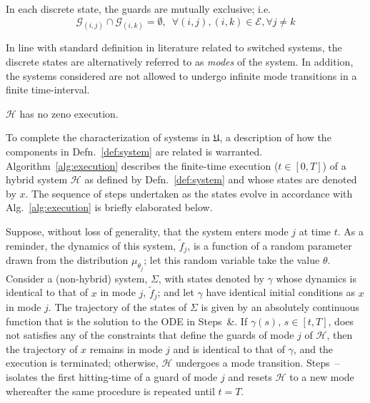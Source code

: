 \begin{assump}
    In each discrete state, the guards are mutually exclusive; i.e.
    $$\mathcal G_{(i,j)}\cap \mathcal G_{(i,k)}=\emptyset,\phantom{8}\forall (i,j),(i,k)\in \mathcal E, \forall j\ne k$$
\end{assump}
In line with standard definition in literature related to switched systems, the discrete states are alternatively referred to as {\em modes} of the system. In addition, the systems considered are not allowed to undergo infinite mode transitions in a finite time-interval.
\begin{assump}
  $\mathcal H$ has no zeno execution.
\end{assump}
To complete the characterization of systems in $\mathfrak{U}$, a description of how the components in Defn.~\ref{def:system} are related is warranted. Algorithm~\ref{alg:execution} describes the finite-time execution ($t\in [0,T]$) of a hybrid system $\mathcal H$ as defined by Defn.~\ref{def:system} and whose states are denoted by $x$. The sequence of steps undertaken as the states evolve in accordance with Alg.~\ref{alg:execution} is briefly elaborated below.
\par
Suppose, without loss of generality, that the system enters mode $j$ at time $t$. As a reminder, the dynamics of this system, $\tilde f_j$, is a function of a random parameter drawn from the distribution $\mu_{\theta_j}$; let this random variable take the value $\theta$. Consider a (non-hybrid) system, $\Sigma$, with states denoted by $\gamma$ whose dynamics is identical to that of $x$ in mode $j$, $\tilde f_j$; and let $\gamma$ have identical initial conditions as $x$ in mode $j$. The trajectory of the states of $\Sigma$ is given by an absolutely continuous function that is the solution to the ODE in Steps~\&. If $\gamma(s),\,s\in [t,T]$, does not satisfies any of the constraints that define the guards of mode $j$ of $\mathcal H$, then the trajectory of $x$ remains in mode $j$ and is identical to that of $\gamma$, and the execution is terminated; otherwise, $\mathcal H$ undergoes a mode transition. Steps~-- isolates the first hitting-time of a guard of mode $j$ and resets $\mathcal H$ to a new mode whereafter the same procedure is repeated until $t=T$.
\par
